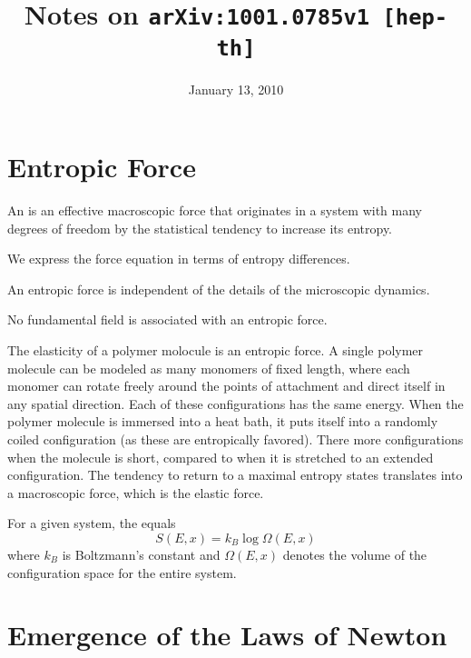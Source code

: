 \documentclass{article}
\title{Notes on {\tt arXiv:1001.0785v1 [hep-th]}}
\date{January 13, 2010}
\begin{document}
\maketitle
\tableofcontents

\section{Entropic Force}

\begin{defn}
An  is an effective macroscopic force that
originates in a system with many degrees of freedom by the
statistical tendency to increase its entropy.
\end{defn}

We express the force equation in terms of entropy differences.

\begin{prop}
An entropic force is independent of the details of the
microscopic dynamics.
\end{prop}

\begin{prop}
No fundamental field is associated with an entropic force.
\end{prop}

\begin{ex}
The elasticity of a polymer molocule is an entropic force. A
single polymer molecule can be modeled as many monomers of fixed
length, where each monomer can rotate freely around the points of
attachment and direct itself in any spatial direction. Each of
these configurations has the same energy. When the polymer
molecule is immersed into a heat bath, it puts itself into a
randomly coiled configuration (as these are entropically
favored). There more configurations when the molecule is short,
compared to when it is stretched to an extended
configuration. The tendency to return to a maximal entropy states
translates into a macroscopic force, which is the elastic force.
\end{ex}

\begin{defn}
For a given system, the  equals
\begin{equation}
S(E,x)=k_{B}\log\Omega(E,x)
\end{equation}
where $k_{B}$ is Boltzmann's constant and $\Omega(E,x)$ denotes
the volume of the configuration space for the entire system.
\end{defn}

\section{Emergence of the Laws of Newton}
\end{document}
